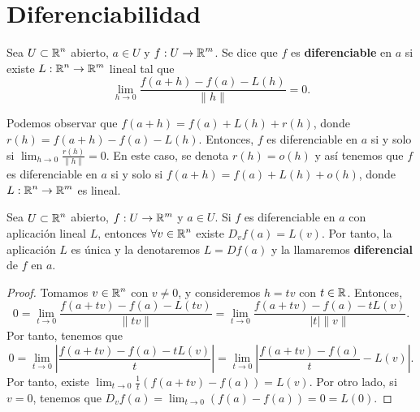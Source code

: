 \section{Diferenciabilidad}
\begin{definition}[Diferenciabilidad]
Sea $\displaystyle U \subset \mathbb{R}^{n} $ abierto, $\displaystyle a \in U $ y $\displaystyle f : U \to \mathbb{R}^{m} $. Se dice que $\displaystyle f $ es \textbf{diferenciable} en $\displaystyle a $ si existe $\displaystyle L : \mathbb{R}^{n} \to \mathbb{R}^{m} $ lineal tal que 
\[\lim_{h \to 0}\frac{f\left(a+h\right)-f\left(a\right)-L\left(h\right)}{ \|h\|} = 0.\]
\end{definition}
\begin{observation}
Podemos observar que $\displaystyle f\left(a+h\right) = f\left(a\right) + L\left(h\right) + r\left(h\right) $, donde $\displaystyle r\left(h\right) = f\left(a+h\right)-f\left(a\right)-L\left(h\right) $. Entonces, $\displaystyle f $ es diferenciable en $\displaystyle a $ si y solo si $\displaystyle \lim_{h \to 0}\frac{r\left(h\right)}{ \|h\|} = 0 $. En este caso, se denota $\displaystyle r\left(h\right) = o\left(h\right) $ y así tenemos que $\displaystyle f $ es diferenciable en $\displaystyle a $ si y solo si $\displaystyle f\left(a+h\right) = f\left(a\right)+L\left(h\right)+o\left(h\right) $, donde $\displaystyle L : \mathbb{R}^{n} \to \mathbb{R}^{m} $ es lineal.
\end{observation}
\begin{prop}
Sea $\displaystyle U \subset \mathbb{R}^{n} $ abierto, $\displaystyle f : U \to \mathbb{R}^{m} $ y $\displaystyle a \in U $. Si $\displaystyle f $ es diferenciable en $\displaystyle a $ con aplicación lineal $\displaystyle L $, entonces $\displaystyle \forall v \in \mathbb{R}^{n} $ existe $\displaystyle D_{v}f\left(a\right) = L\left(v\right) $. Por tanto, la aplicación $\displaystyle L $ es única y la denotaremos $\displaystyle L = Df\left(a\right) $ y la llamaremos \textbf{diferencial} de $\displaystyle f $ en $\displaystyle a $.
\end{prop}
\begin{proof}
Tomamos $\displaystyle v \in \mathbb{R}^{n} $ con $\displaystyle v \neq 0 $, y consideremos $\displaystyle h = tv $ con $\displaystyle t \in \mathbb{R} $. Entonces, 
\[0 = \lim_{t \to 0}\frac{f\left(a+tv\right)-f\left(a\right)-L\left(tv\right)}{ \|tv\|} = \lim_{t \to 0}\frac{f\left(a+tv\right)-f\left(a\right)-tL\left(v\right)}{ \left|t\right|\|v\|} .\]
Por tanto, tenemos que 
\[0 = \lim_{t \to 0} \left|\frac{f\left(a+tv\right)-f\left(a\right)-tL\left(v\right)}{t}\right| = \lim_{t \to 0} \left|\frac{f\left(a+tv\right)-f\left(a\right)}{t}-L\left(v\right)\right| .\]
Por tanto, existe $\displaystyle \lim_{t \to 0}\frac{1}{t}\left(f\left(a+tv\right)-f\left(a\right)\right) = L\left(v\right) $. Por otro lado, si $\displaystyle v = 0 $, tenemos que $\displaystyle D_{v}f\left(a\right) = \lim_{t \to 0}\left(f\left(a\right)-f\left(a\right)\right) = 0 = L\left(0\right) $.
\end{proof}
